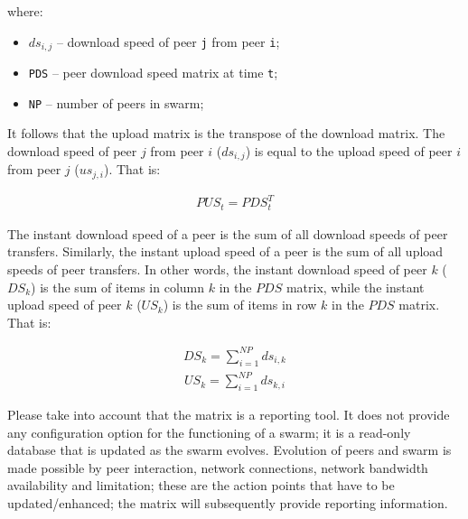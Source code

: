 where:

\begin{itemize}
  \item $ds_{i,j}$ -- download speed of peer \texttt{j} from peer \texttt{i};
  \item \texttt{PDS} -- peer download speed matrix at time \texttt{t};
  \item \texttt{NP} -- number of peers in swarm;
\end{itemize}

It follows that the upload matrix is the transpose of the download matrix. The
download speed of peer $j$ from peer $i$ ($ds_{i,j}$) is equal to the upload
speed of peer $i$ from peer $j$ ($us_{j,i}$). That is:

\begin{align}
  PUS_{t} = PDS_{t}^{T}
\end{align}

The instant download speed of a peer is the sum of all download speeds of peer
transfers. Similarly, the instant upload speed of a peer is the sum of all
upload speeds of peer transfers. In other words, the instant download speed of
peer $k$ ($DS_{k}$) is the sum of items in column $k$ in the $PDS$ matrix,
while the instant upload speed of peer $k$ ($US_{k}$) is the sum of items in
row $k$ in the $PDS$ matrix. That is:

\begin{align}
  DS_{k} = \sum_{i=1}^{NP} ds_{i,k}
\end{align}
\begin{align}
  US_{k} = \sum_{i=1}^{NP} ds_{k,i}
\end{align}

Please take into account that the matrix is a reporting tool. It does not
provide any configuration option for the functioning of a swarm; it is a
read-only database that is updated as the swarm evolves. Evolution of peers
and swarm is made possible by peer interaction, network connections, network
bandwidth availability and limitation; these are the action points that have
to be updated/enhanced; the matrix will subsequently provide reporting
information.
